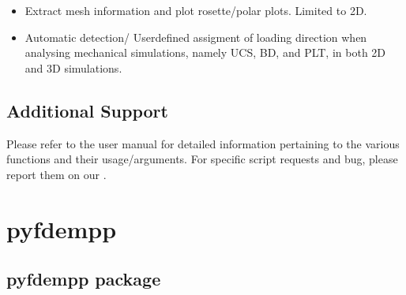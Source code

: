 \documentclass[letterpaper,10pt,english]{sphinxmanual}
\begin{document}
\sphinxAtStartPar
{}
\begin{itemize}
\item {} 
\sphinxAtStartPar
Extract mesh information and plot rosette/polar plots. Limited to 2D.

\end{itemize}

\sphinxAtStartPar
{}
\begin{itemize}
\item {} 
\sphinxAtStartPar
Automatic detection/ User\sphinxhyphen{}defined assigment of loading direction when analysing mechanical simulations, namely UCS, BD, and PLT, in both 2D and 3D simulations.

\end{itemize}

\begin{sphinxVerbatim}[commandchars=\\\{\}]
\end{sphinxVerbatim}


\section{Additional Support}
\label{\detokenize{postprocessing_intro:additional-support}}
\sphinxAtStartPar
Please refer to the user manual for detailed information pertaining to the various functions and their usage/arguments. For specific script requests and bug, please report them on our .

\sphinxstepscope


\chapter{pyfdempp}
\label{\detokenize{modules:pyfdempp}}\label{\detokenize{modules::doc}}
\sphinxstepscope


\section{pyfdempp package}
\label{\detokenize{pyfdempp:pyfdempp-package}}\label{\detokenize{pyfdempp::doc}}
\end{document}
